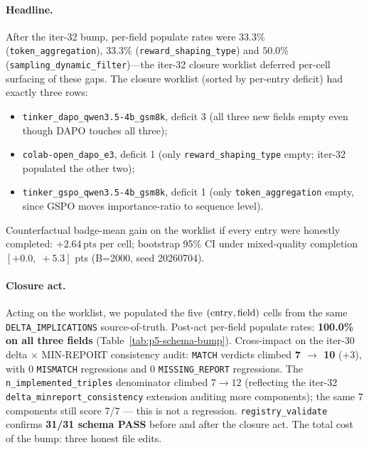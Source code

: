 \documentclass{article}  \usepackage[preprint,nonatbib]{neurips_2026} \usepackage[numbers]{natbib}
\providecommand{\tableref}[1]{Table~\ref{#1}}
\begin{document}
\paragraph{Headline.}
After the iter-32 bump, per-field populate rates were
$33.3\%$ (\texttt{token\_aggregation}), $33.3\%$
(\texttt{reward\_shaping\_type}) and $50.0\%$
(\texttt{sampling\_dynamic\_filter})---the iter-32 closure
worklist deferred per-cell surfacing of these gaps. The closure
worklist (sorted by per-entry deficit) had exactly three rows:
\begin{itemize}
\item \texttt{tinker\_dapo\_qwen3.5-4b\_gsm8k}, deficit 3 (all
      three new fields empty even though DAPO touches all three);
\item \texttt{colab-open\_dapo\_e3}, deficit 1 (only
      \texttt{reward\_shaping\_type} empty; iter-32 populated the
      other two);
\item \texttt{tinker\_gspo\_qwen3.5-4b\_gsm8k}, deficit 1
      (only \texttt{token\_aggregation} empty, since GSPO moves
      importance-ratio to sequence level).
\end{itemize}
Counterfactual badge-mean gain on the worklist if every entry
were honestly completed: $+2.64\,\mathrm{pts}$ per cell;
bootstrap 95\% CI under mixed-quality completion $[+0.0,\;+5.3]$
pts (B=2000, seed 20260704).

\paragraph{Closure act.}
Acting on the worklist, we populated the five $({\rm entry},
{\rm field})$ cells from the same
\texttt{DELTA\_IMPLICATIONS} source-of-truth. Post-act per-field
populate rates: \textbf{100.0\% on all three fields}
(\tableref{tab:p5-schema-bump}). Cross-impact on the iter-30
delta $\times$ MIN-REPORT consistency audit:
\texttt{MATCH} verdicts climbed \textbf{7 $\to$ 10}
($+3$), with $0$ \texttt{MISMATCH} regressions and $0$
\texttt{MISSING\_REPORT} regressions. The
\texttt{n\_implemented\_triples} denominator climbed $7\to12$
(reflecting the iter-32 \texttt{delta\_minreport\_consistency}
extension auditing more components); the same 7 components still
score 7/7 --- this is not a regression. \texttt{registry\_validate}
confirms \textbf{31/31 schema PASS} before and after the closure
act. The total cost of the bump: three honest file edits.
\end{document}
